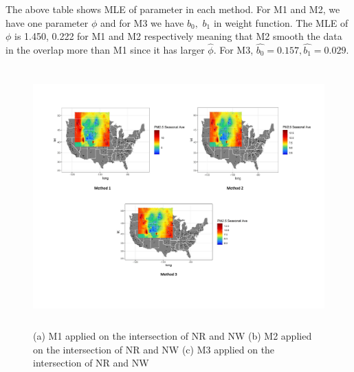 \documentclass[10pt]{article}
\theoremstyle{plain}
\theoremstyle{definition}
\theoremstyle{remark}
\begin{document}
The above table shows MLE of parameter in each method.
For M1 and M2, we have one parameter $\phi$ and for M3 we have $b_0 ,$ $b_1$ in weight function. The MLE of $\phi$ is 1.450, 0.222 for M1 and M2 respectively meaning that M2 smooth the data in the overlap more than M1 since it has larger $\hat{\phi}$. For M3, $\hat{b_0}=0.157  ,\hat{b_1}=0.029.$



\begin{figure}[!ht]
	\centering
	\includegraphics[width = 18cm, scale = 1, height = 10cm]{All_Methods}
	\vspace{-5em}
	\caption{ (a) M1 applied on the intersection of NR and NW (b) M2 applied on the intersection of NR and NW  (c) M3 applied on the intersection of NR and NW 
		\vspace{-1em}
		\label{fig: Applying M1, M2, M3 on the intersection of NR and NW}}
\end{figure}
\end{document}
